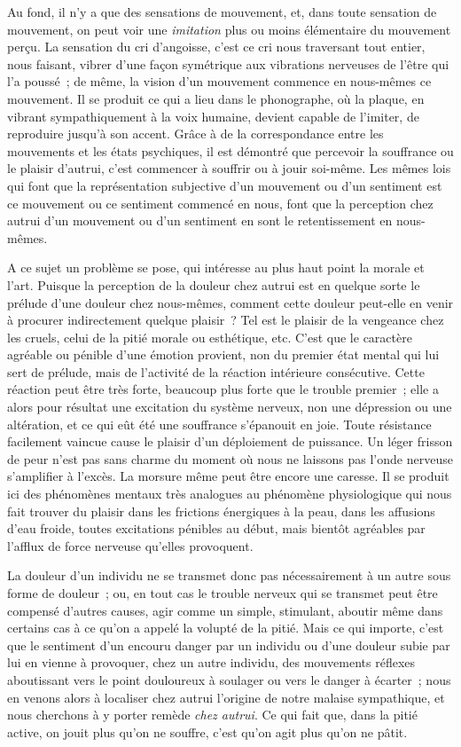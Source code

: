 \documentclass[french,twoside]{book} %
\begin{document}
Au fond, il n’y a que des sensations de mouvement, et, dans toute sensation de mouvement, on peut voir une \emph{imitation} plus ou moins élémentaire du mouvement perçu. La sensation du cri d’angoisse, c’est ce cri nous traversant tout entier, nous faisant, vibrer d’une façon symétrique aux vibrations nerveuses de l’être qui l’a poussé ; de même, la vision d’un mouvement commence en nous-mêmes ce mouvement. Il se produit ce qui a lieu dans le phonographe, où la plaque, en vibrant sympathiquement à la voix humaine, devient capable de l’imiter, de reproduire jusqu’à son accent. Grâce à de la correspondance entre les mouvements et les états psychiques, il est démontré que percevoir la souffrance ou le plaisir d’autrui, c’est commencer à souffrir ou à jouir soi-même. Les mêmes lois qui font que la représentation subjective d’un mouvement ou d’un sentiment est ce mouvement ou ce sentiment commencé en nous, font que la perception chez autrui d’un mouvement ou d’un sentiment en sont le retentissement en nous-mêmes.\par
A ce sujet un problème se pose, qui intéresse au plus haut point la morale et l’art. Puisque la perception de la douleur chez autrui est en quelque sorte le prélude d’une douleur chez nous-mêmes, comment cette douleur peut-elle en venir à procurer indirectement quelque plaisir ? Tel est le plaisir de la vengeance chez les cruels, celui de la pitié morale ou esthétique, etc. C’est que le caractère agréable ou pénible d’une émotion provient, non du premier état mental qui lui sert de prélude, mais de l’activité de la réaction intérieure consécutive. Cette réaction peut être très forte, beaucoup plus forte que le trouble premier ; elle a alors pour résultat une excitation du système nerveux, non une dépression ou une altération, et ce qui eût été une souffrance s’épanouit en joie. Toute résistance facilement vaincue cause le plaisir d’un déploiement de puissance. Un léger frisson de peur n’est pas sans charme du moment où nous ne laissons pas l’onde nerveuse s’amplifier à l’excès. La morsure même peut être encore une caresse. Il se produit ici des phénomènes mentaux très analogues au phénomène physiologique qui nous fait trouver du plaisir dans les frictions énergiques à la peau, dans les affusions d’eau froide, toutes excitations pénibles au début, mais bientôt agréables par l’afflux de force nerveuse qu’elles provoquent.\par
La douleur d’un individu ne se transmet donc pas nécessairement à un autre sous forme de douleur ; ou, en tout cas le trouble nerveux qui se transmet peut être compensé d’autres causes, agir comme un simple, stimulant, aboutir même dans certains cas à ce qu’on a appelé la volupté de la pitié. Mais ce qui importe, c’est que le sentiment d’un encouru danger par un individu ou d’une douleur subie par lui en vienne à provoquer, chez un autre individu, des mouvements réflexes aboutissant vers le point douloureux à soulager ou vers le danger à écarter ; nous en venons alors à localiser chez autrui l’origine de notre malaise sympathique, et nous cherchons à y porter remède \emph{chez autrui}. Ce qui fait que, dans la pitié active, on jouit plus qu’on ne souffre, c’est qu’on agit plus qu’on ne pâtit.\par
\end{document}
